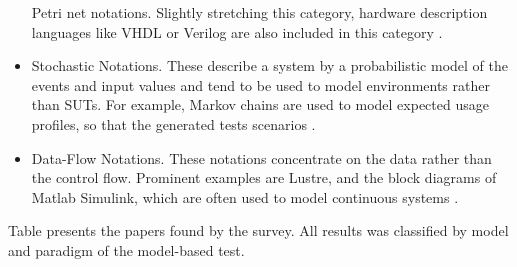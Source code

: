 \documentclass{report}
\begin{document}
\begin{itemize}
Petri net notations. Slightly stretching this category, hardware description languages like VHDL
or Verilog are also included in this category \cite{MarkUtting2012}.
\item Stochastic Notations. These describe a system by a probabilistic model of the events and input
values and tend to be used to model environments rather than SUTs. For example, Markov chains
are used to model expected usage profiles, so that the generated tests scenarios \cite{MarkUtting2012}.
\item Data-Flow Notations. These notations concentrate on the data rather than the control flow.
Prominent examples are Lustre, and the block diagrams of Matlab Simulink, which are often used
to model continuous systems \cite{MarkUtting2012}.
\end{itemize}


Table presents the papers found by the survey. All results was classified by model and paradigm of the model-based test.
\end{document}
